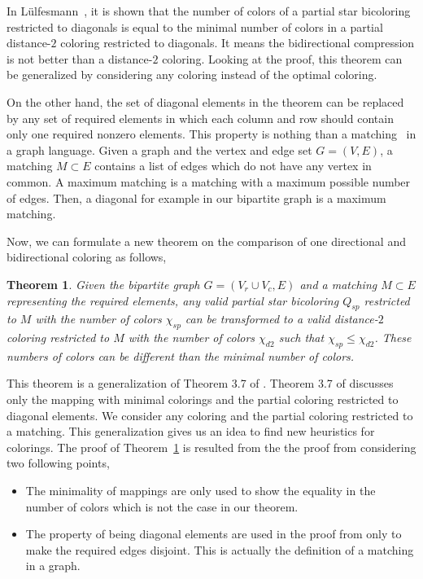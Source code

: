 \documentclass[11pt, twoside,a4paper]{book}
\newtheorem{theorem}{Theorem}
\begin{document}
In Lülfesmann~\cite{Lulfesmann2012Fap}, it is shown that the number of colors of
a partial star bicoloring restricted to diagonals is equal to
the minimal number of colors in a partial distance-$2$ coloring restricted
to diagonals. It means the bidirectional compression is not better than
a distance-$2$ coloring.
Looking at the proof, this theorem can be generalized by considering any
coloring instead of the optimal coloring.

On the other hand, the set of diagonal elements in the theorem
can be replaced by any set of required elements
in which each column and row should contain only one required nonzero elements.
This property is nothing than a matching~\cite{bondy2008graph} in a graph language.
Given a graph and the vertex and edge set $G=(V,E)$, a matching $M\subset E$ contains
a list of edges which do not have any vertex in common.
A maximum matching is a matching with a maximum possible number of edges.
Then, a diagonal for example in our bipartite graph is a maximum matching.

Now, we can formulate a new theorem on the comparison of one directional and
bidirectional coloring as follows,
\begin{theorem}
\label{t.matching}
Given the bipartite graph $G=(V_r\cup V_c,E)$ and a matching $M\subset E$ representing
the required elements, any valid partial star bicoloring $Q_{sp}$ restricted to $M$
with the number of colors $\chi_{sp}$
can be transformed to a valid distance-$2$ coloring restricted to $M$
with the number of colors $\chi_{d2}$ such that $\chi_{sp} \leq \chi_{d2}$.
These numbers of colors can be different than the minimal number of colors.
\end{theorem}
This theorem is a generalization of Theorem 3.7 of \cite{Lulfesmann2012Fap}.
Theorem 3.7 of \cite{Lulfesmann2012Fap} discusses only the mapping with minimal colorings
and the partial coloring restricted to diagonal elements. We consider any coloring
and the partial coloring restricted to a matching. This generalization gives us an idea
to find new heuristics for colorings. The proof of Theorem~\ref{t.matching} 
is resulted from the the proof from \cite{Lulfesmann2012Fap} considering two following points,
\begin{itemize}
\item The minimality of mappings are only used to show the equality in the number of colors which is not 
the case in our theorem.
\item The property of being diagonal elements are used in the proof from \cite{Lulfesmann2012Fap} only to 
make the required edges disjoint. This is actually the definition of a matching in a graph.
\end{itemize}
\end{document}
